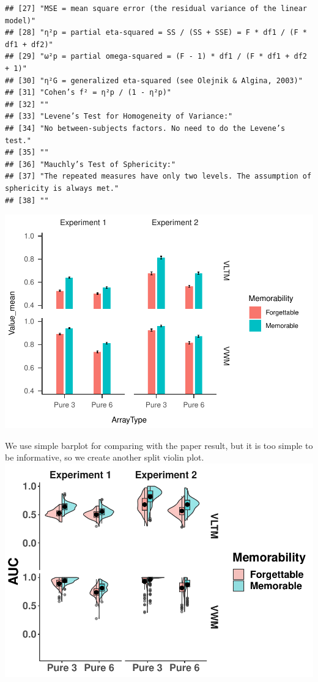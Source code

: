 \documentclass[
  man]{apa6}
\begin{document}
\begin{verbatim}
## [27] "MSE = mean square error (the residual variance of the linear model)"                    
## [28] "η²p = partial eta-squared = SS / (SS + SSE) = F * df1 / (F * df1 + df2)"                
## [29] "ω²p = partial omega-squared = (F - 1) * df1 / (F * df1 + df2 + 1)"                      
## [30] "η²G = generalized eta-squared (see Olejnik & Algina, 2003)"                             
## [31] "Cohen’s f² = η²p / (1 - η²p)"                                                           
## [32] ""                                                                                       
## [33] "Levene’s Test for Homogeneity of Variance:"                                             
## [34] "No between-subjects factors. No need to do the Levene’s test."                          
## [35] ""                                                                                       
## [36] "Mauchly’s Test of Sphericity:"                                                          
## [37] "The repeated measures have only two levels. The assumption of sphericity is always met."
## [38] ""
\end{verbatim}

\includegraphics{Script_Re_Greer_2023_group1Rock_2023_files/figure-latex/plot for efficiency hypothesis-1.pdf}

We use simple barplot for comparing with the paper result, but it is too simple to be informative, so we create another split violin plot.
\includegraphics{Script_Re_Greer_2023_group1Rock_2023_files/figure-latex/Split violin plots for efficiency hypo-1.pdf}
\end{document}
